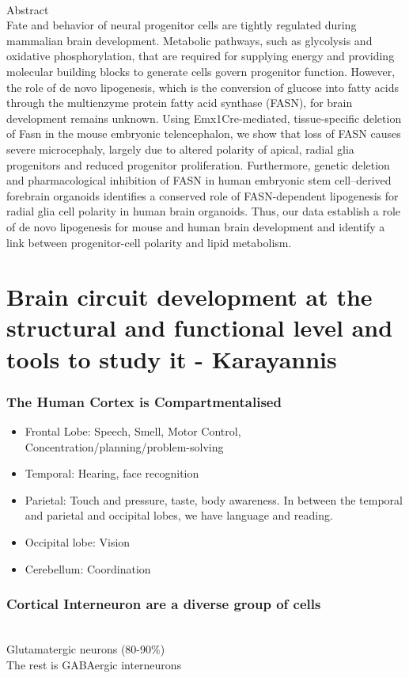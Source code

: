 \begin{itemize}
\begin{itemize}
\\Abstract
\\Fate and behavior of neural progenitor cells are tightly regulated during mammalian brain development. Metabolic pathways, such as glycolysis and oxidative phosphorylation, that are required for supplying energy and providing molecular building blocks to generate cells govern progenitor function. However, the role of de novo lipogenesis, which is the conversion of glucose into fatty acids through the multienzyme protein fatty acid synthase (FASN), for brain development remains unknown. Using Emx1Cre-mediated, tissue-specific deletion of Fasn in the mouse embryonic telencephalon, we show that loss of FASN causes severe microcephaly, largely due to altered polarity of apical, radial glia progenitors and reduced progenitor proliferation. Furthermore, genetic deletion and pharmacological inhibition of FASN in human embryonic stem cell–derived forebrain organoids identifies a conserved role of FASN-dependent lipogenesis for radial glia cell polarity in human brain organoids. Thus, our data establish a role of de novo lipogenesis for mouse and human brain development and identify a link between progenitor-cell polarity and lipid metabolism.

\section{Brain circuit development at the structural and functional level and tools to study it - Karayannis}
\subsubsection{The Human Cortex is Compartmentalised}
\begin{itemize}
    \item Frontal Lobe: Speech, Smell, Motor Control, Concentration/planning/problem-solving
    \item Temporal: Hearing, face recognition
    \item Parietal: Touch and pressure, taste, body awareness. In between the temporal and parietal and occipital lobes, we have language and reading.
    \item Occipital lobe: Vision
    \item Cerebellum: Coordination
\end{itemize}

\subsubsection{Cortical Interneuron are a diverse group of cells}
\\Glutamatergic neurons (80-90$\%$)
\\The rest is GABAergic interneurons

\end{itemize}
\end{itemize}
